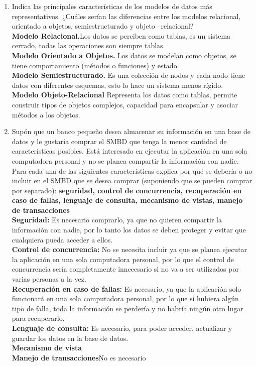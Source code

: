 \documentclass[12pt]{article}
\begin{document}
\begin{enumerate}
\begin{itemize}
	  \end{itemize}
  
      \item Indica las principales características de los modelos de
      datos más representativos. ¿Cuáles serían las diferencias
      entre los  modelos relacional, orientado a objetos,
      semiestructurado y objeto –relacional?\\
      \textbf{Modelo Relacional.}Los datos se perciben como tablas,
      es un sistema cerrado, todas las operaciones son siempre tablas.\\
      \textbf{Modelo Orientado a Objetos.} Los datos se modelan como
      objetos, se tiene comportamiento (métodos o funciones) y estado.\\
      \textbf{Modelo Semiestructurado.} Es una colección de nodos y
      cada nodo tiene datos con diferentes esquemas, esto lo hace un 
      sistema menos rígido.\\
      \textbf{Modelo Objeto-Relacional} Representa los datos como tablas,
      permite construir tipos de objetos complejos, capacidad para
      encapsular y asociar métodos a los objetos.
      
      \item Supón  que  un banco pequeño desea  almacenar  su
      información  en una  base  de  datos  y  le gustaría comprar
      el SMBD que  tenga  la  menor  cantidad  de  características
      posibles. Está interesado en ejecutar la aplicación en una sola computadora personal y no se planea compartir la 
      información  con  nadie.  Para  cada  una  de  las
      siguientes  características  explica  por  qué  se debería o
      no incluir en el SMBD que se desea comprar (suponiendo que se
      pueden comprar por separado): \textbf{seguridad, control de
      concurrencia, recuperación en caso de fallas, lenguaje de
      consulta, mecanismo de vistas, manejo de transacciones}\\
      \textbf{Seguridad:} Es necesario comprarlo, ya que no quieren
      compartir la información con nadie, por lo tanto los datos
      se deben proteger y evitar que cualquiera pueda acceder a 
      ellos.\\
      \textbf{Control de concurrencia:} No se necesita incluir ya que
      se planea ejecutar la aplicación en una sola computadora 
      personal, por lo que el control de concurrencia sería 
      completamente innecesario si no va a ser utilizados por varias
      personas a la vez.\\
      \textbf{Recuperación en caso de fallas:} Es necesario, ya que
      la aplicación solo funcionará en una sola computadora personal,
      por lo que si hubiera algún tipo de falla, toda la información
      se perdería y no habría ningún otro lugar para recuperarlo.\\
      \textbf{Lenguaje de consulta:} Es necesario, para poder acceder,
      actualizar y guardar los datos en la base de datos.\\
      \textbf{Mecanismo de vista}\\
      \textbf{Manejo de transacciones}No es necesario\\
      
      
	   	
 \end{enumerate}
\end{document}
